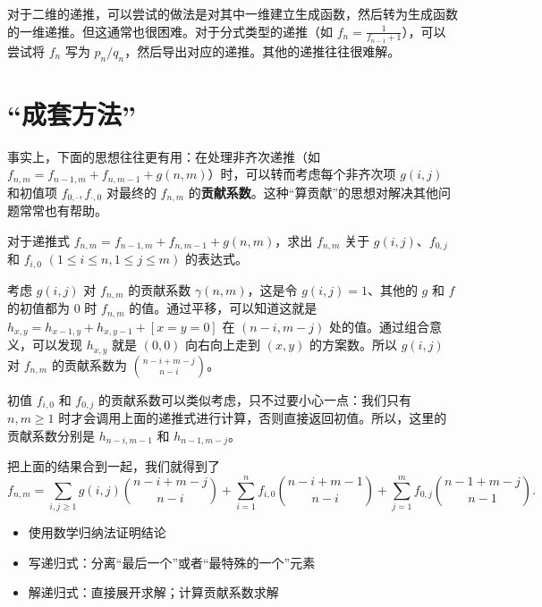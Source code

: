 对于二维的递推，可以尝试的做法是对其中一维建立生成函数，然后转为生成函数的一维递推。但这通常也很困难。对于分式类型的递推（如 $f_n=\frac{1}{f_{n-1}+1}$），可以尝试将 $f_n$ 写为 $p_n/q_n$，然后导出对应的递推。其他的递推往往很难解。



\section{“成套方法”}
事实上，下面的思想往往更有用：在处理非齐次递推（如 $f_{n,m}=f_{n-1,m}+f_{n,m-1}+g(n,m)$）时，可以转而考虑每个非齐次项 $g(i,j)$ 和初值项 $f_{0,\cdot},f_{\cdot,0}$ 对最终的 $f_{n,m}$ 的\textbf{贡献系数}。这种“算贡献”的思想对解决其他问题常常也有帮助。

\begin{example}\label{example: 2d-recurrence}
    对于递推式 $f_{n,m}=f_{n-1,m}+f_{n,m-1}+g(n,m)$，求出 $f_{n,m}$ 关于 $g(i,j)$、$f_{0,j}$ 和 $f_{i,0}$ $(1\le i\le n,1\le j\le m)$ 的表达式。
\end{example}
\begin{solution}
    考虑 $g(i,j)$ 对 $f_{n,m}$ 的贡献系数 $\gamma(n,m)$，这是令 $g(i,j)=1$、其他的 $g$ 和 $f$ 的初值都为 $0$ 时 $f_{n,m}$ 的值。通过平移，可以知道这就是 $h_{x,y}=h_{x-1,y}+h_{x,y-1}+[x=y=0]$ 在 $(n-i,m-j)$ 处的值。通过组合意义，可以发现 $h_{x,y}$ 就是 $(0,0)$ 向右向上走到 $(x,y)$ 的方案数。所以 $g(i,j)$ 对 $f_{n,m}$ 的贡献系数为 $\binom{n-i+m-j}{n-i}$。
    
    初值 $f_{i,0}$ 和 $f_{0,j}$ 的贡献系数可以类似考虑，只不过要小心一点：我们只有 $n,m\ge 1$ 时才会调用上面的递推式进行计算，否则直接返回初值。所以，这里的贡献系数分别是 $h_{n-i,m-1}$ 和 $h_{n-1,m-j}$。

    把上面的结果合到一起，我们就得到了
    $$
    f_{n,m}=\sum_{i,j\ge 1}g(i,j)\binom{n-i+m-j}{n-i}+\sum_{i=1}^n f_{i,0}\binom{n-i+m-1}{n-i}+\sum_{j=1}^m f_{0,j}\binom{n-1+m-j}{n-1}.
    $$
\end{solution}

\begin{summary}
    \begin{itemize}
        \item 使用数学归纳法证明结论
        \item 写递归式：分离“最后一个”或者“最特殊的一个”元素
        \item 解递归式：直接展开求解；计算贡献系数求解
    \end{itemize}
\end{summary}